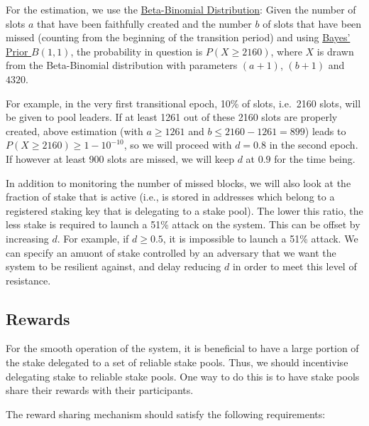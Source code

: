 \documentclass[11pt,a4paper]{article}
\begin{document}
For the estimation, we use the
\href{https://en.wikipedia.org/wiki/Beta-binomial_distribution}{Beta-Binomial
Distribution}: Given the number of slots \(a\) that have been faithfully
created and the number \(b\) of slots that have been missed (counting
from the beginning of the transition period) and using
\href{https://en.wikipedia.org/wiki/Beta_distribution\#Bayes'_prior_probability_(Beta(1,1))}{Bayes'
Prior \(B(1,1)\)}, the probability in question is \(P(X\geq 2160)\),
where \(X\) is drawn from the Beta-Binomial distribution with parameters
\((a + 1)\), \((b + 1)\) and \(4320\).

For example, in the very first transitional epoch, 10\% of slots,
i.e.~2160 slots, will be given to pool leaders. If at least 1261 out of
these 2160 slots are properly created, above estimation (with
\(a\geq 1261\) and \(b\leq 2160-1261=899\)) leads to
\(P(X\geq 2160)\geq 1-10^{-10}\), so we will proceed with \(d=0.8\) in
the second epoch. If however at least 900 slots are missed, we will keep
\(d\) at \(0.9\) for the time being.

In addition to monitoring the number of missed blocks, we will also look
at the fraction of stake that is active (i.e., is stored in addresses
which belong to a registered staking key that is delegating to a stake
pool). The lower this ratio, the less stake is required to launch a 51\%
attack on the system. This can be offset by increasing \(d\). For
example, if \(d \geq 0.5\), it is impossible to launch a 51\% attack. We
can specify an amuont of stake controlled by an adversary that we want
the system to be resilient against, and delay reducing \(d\) in order to
meet this level of resistance.

\subsection{Rewards}\label{rewards}

For the smooth operation of the system, it is beneficial to have a large
portion of the stake delegated to a set of reliable stake pools. Thus,
we should incentivise delegating stake to reliable stake pools. One way
to do this is to have stake pools share their rewards with their
participants.

The reward sharing mechanism should satisfy the following requirements:
\end{document}
